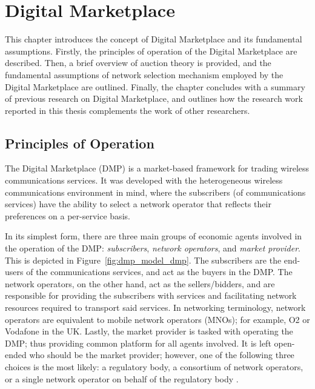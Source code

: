 \chapter{Digital Marketplace} %
\label{cha:dmp}

\minitoc
\vspace{10mm}

This chapter introduces the concept of Digital Marketplace and its fundamental assumptions. Firstly, the principles of operation of the Digital Marketplace are described. Then, a brief overview of auction theory is provided, and the fundamental assumptions of network selection mechanism employed by the Digital Marketplace are outlined. Finally, the chapter concludes with a summary of previous research on Digital Marketplace, and outlines how the research work reported in this thesis complements the work of other researchers.

\section{Principles of Operation} %
\label{sec:principles_of_operation_dmp}
The Digital Marketplace (DMP) is a market-based framework for trading wireless communications services. It was developed with the heterogeneous wireless communications environment in mind, where the subscribers (of communications services) have the ability to select a network operator that reflects their preferences on a per-service basis.

In its simplest form, there are three main groups of economic agents involved in the operation of the DMP: \emph{subscribers}, \emph{network operators}, and \emph{market provider}. This is depicted in Figure~\ref{fig:dmp_model_dmp}. The subscribers are the end-users of the communications services, and act as the buyers in the DMP. The network operators, on the other hand, act as the sellers/bidders, and are responsible for providing the subscribers with services and facilitating network resources required to transport said services. In networking terminology, network operators are equivalent to mobile network operators (MNOs); for example, O2 or Vodafone in the UK. Lastly, the market provider is tasked with operating the DMP; thus providing common platform for all agents involved. It is left open-ended who should be the market provider; however, one of the following three choices is the most likely: a regulatory body, a consortium of network operators, or a single network operator on behalf of the regulatory body \cite{DMLeBodic00,DMIrvine02}.

